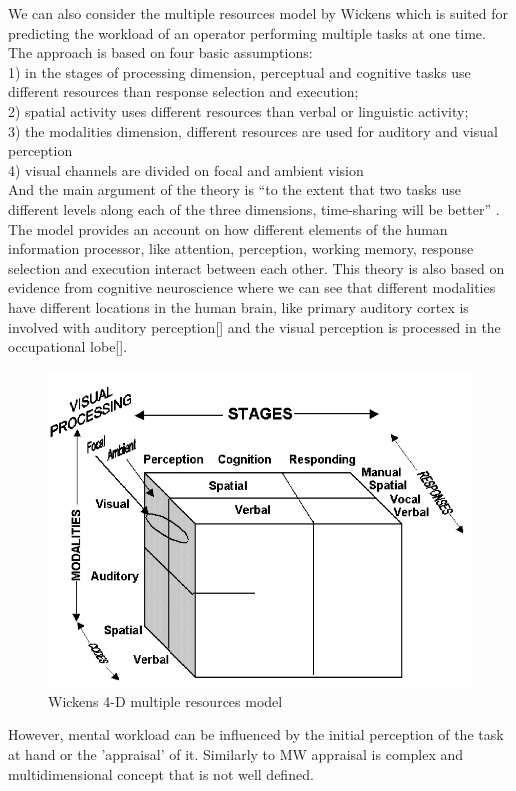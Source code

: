 \documentclass[a4paper]{report}
\begin{document}
			We can also consider the multiple resources model by Wickens\cite{wickens2008multiple,wickens2002multiple} which is suited for predicting the workload of an operator performing multiple tasks at one time. The approach is based on four basic assumptions:\\

			1) in the stages of processing dimension, perceptual and cognitive tasks use different resources than response selection and execution;\\
			2) spatial activity uses different resources than verbal or linguistic activity;\\
			3) the modalities dimension, different resources are used for auditory and visual perception\\
			4) visual channels are divided on focal and ambient vision\\
			And the main argument of the theory is ``to the extent that two tasks use different levels along each of the three dimensions, time-sharing will be better'' \cite{wickens2008multiple}. The model provides an account on how different elements of the human information processor, like attention, perception, working memory, response selection and execution interact between each other. This theory is also based on evidence from cognitive neuroscience where we can see that different modalities have different locations in the human brain, like primary auditory cortex is involved with auditory perception[] and the visual perception is processed in the occupational lobe[].\\
				\begin{figure}[h]
					\centering
					\includegraphics[width=0.7\linewidth]{mrt}
					\caption[Multiple resource theory by Wickens]{Wickens 4-D multiple resources model}
					\label{fig:mrt}
				\end{figure}
			However, mental workload can be influenced by the initial perception of the task at hand or the 'appraisal' of it. Similarly to MW appraisal is complex and multidimensional concept\cite{folkman1986dynamics,peacock1990stress} that is not well defined.
		
\end{document}

